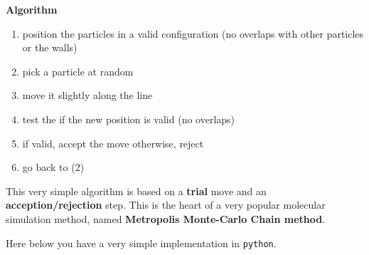 \documentclass[
  letterpaper,
  enabledeprecatedfontcommands]{report}
\providecommand{\tightlist}{%
  \setlength{\itemsep}{0pt}\setlength{\parskip}{0pt}}
\begin{document}
\begin{tcolorbox}[enhanced jigsaw, breakable, colframe=quarto-callout-note-color-frame, colback=white, arc=.35mm, left=2mm, leftrule=.75mm, bottomrule=.15mm, rightrule=.15mm, toprule=.15mm, opacityback=0]
\begin{minipage}[t]{5.5mm}
\textcolor{quarto-callout-note-color}{\faInfo}
\end{minipage}%
\begin{minipage}[t]{\textwidth - 5.5mm}

\vspace{-3mm}\textbf{Algorithm}\vspace{3mm}

\begin{enumerate}
\def\labelenumi{\arabic{enumi}.}
\tightlist
\item
  position the particles in a valid configuration (no overlaps with
  other particles or the walls)
\item
  pick a particle at random
\item
  move it slightly along the line
\item
  test the if the new position is valid (no overlaps)
\item
  if valid, accept the move otherwise, reject
\item
  go back to (2)
\end{enumerate}

\end{minipage}%
\end{tcolorbox}

This very simple algorithm is based on a \textbf{trial} move and an
\textbf{acception/rejection} step. This is the heart of a very popular
molecular simulation method, named \textbf{Metropolis Monte-Carlo Chain
method}.

Here below you have a very simple implementation in \texttt{python}.
\end{document}
